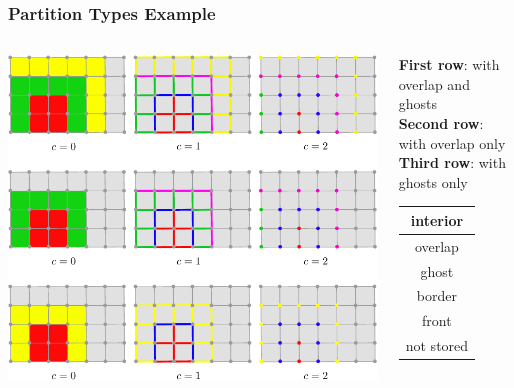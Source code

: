 \begin{frame}[fragile]
\frametitle{Partition Types Example}
\begin{columns}[c]
\begin{column}{0.7\textwidth}

\includegraphics[width=\textwidth]{EPS/partitionsingle}
\end{column}
\begin{column}{0.3\textwidth}
\vskip0.5cm
\textbf{First row}: with overlap and ghosts\\
\textbf{Second row}: with overlap only\\
\textbf{Third row}: with ghosts only
\vskip5mm
\begin{center}
\begin{tabular}{|c|}
\hline\color{red} interior\\\hline
\color{green} overlap\\\hline
\color{yellow} ghost\\\hline
\color{blue} border\\\hline
\color{magenta} front\\\hline
\color{gray} not stored\\\hline
\end{tabular}
\end{center}
\end{column}
\end{columns}

\end{frame}

